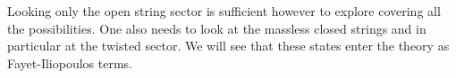 \documentclass{worksheetclass}
\begin{document}
        Looking only the open string sector is sufficient however to explore covering all the possibilities. One also needs to look at the massless closed strings and in particular at the twisted sector. We will see that these states enter the theory as Fayet-Iliopoulos terms.



\end{document}
